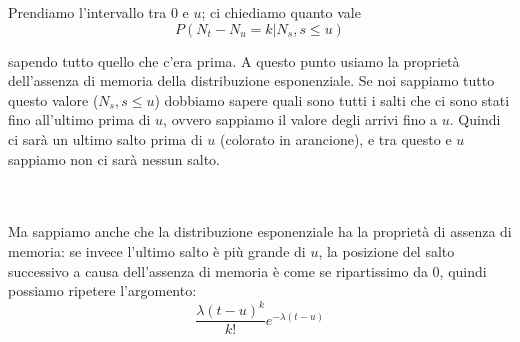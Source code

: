 \documentclass[a4paper,12pt]{book}
\begin{document}
\begin{center}
\end{center}

Prendiamo l'intervallo tra 0 e $ u $; ci chiediamo quanto vale
$$ P(N_t - N_u = k | N_s, s \le u) $$

sapendo tutto quello che c'era prima. A questo punto usiamo la proprietà dell'assenza di memoria della distribuzione esponenziale. Se noi sappiamo tutto questo valore ($ N_s, s \le u $) dobbiamo sapere quali sono tutti i salti che ci sono stati fino all'ultimo prima di $ u $, ovvero sappiamo il valore degli arrivi fino a $ u $. Quindi ci sarà un ultimo salto prima di $ u $ (colorato in arancione), e tra questo e $ u $ sappiamo non ci sarà nessun salto. 
\begin{center}
\end{center}
\begin{multicols}{2}
	\\
	\\
	Ma sappiamo anche che la distribuzione esponenziale ha la proprietà di assenza di memoria: se invece l'ultimo salto è più grande di $ u $, la posizione del salto successivo a causa dell'assenza di memoria è come se ripartissimo da 0, quindi possiamo ripetere l'argomento:	
	$$ \frac{\lambda(t-u)^k}{k!} e^{-\lambda(t-u)} $$
\end{multicols}
\end{document}
